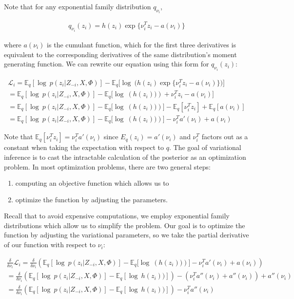 Note that for any exponential family distribution $q_{\nu_i}$, 

\begin{align} q_{\nu_i}(z_i) = h(z_i) \exp \big\{ \nu_i^{T} z_i - a(\nu_i) \big\} \end{align}

where $a(\nu_i)$ is the cumulant function, which for the first three derivatives is equivalent to the corresponding derivatives of the same distribution's moment generating function. We can rewrite our equation using this form for $q_{\nu_i}(z_i)$:


\begin{align} 
\nonumber \mathcal{L}_i = \mathbb{E}_q[\log\ p(z_i| Z_{-i}, X, \Phi)] - \mathbb{E}_q\bigg[\log\ \Big( h(z_i) \exp \big\{ \nu_i^{T} z_i - a(\nu_i) \big\} \Big) \bigg] \\
\nonumber = \mathbb{E}_q[\log\ p(z_i| Z_{-i}, X, \Phi)] -  \mathbb{E}_q\bigg[\log\ \left( h(z_i))\right) + \nu_i^{T} z_i - a(\nu_i) \bigg] \\
\nonumber = \mathbb{E}_q[\log\ p(z_i| Z_{-i}, X, \Phi)] -  \mathbb{E}_q\big[\log\ \left( h(z_i))\right)\big] - \mathbb{E}_q[\nu_i^T z_i]  + \mathbb{E}_q[a(\nu_i)] \\
= \mathbb{E}_q[\log\ p(z_i| Z_{-i}, X, \Phi)] -  \mathbb{E}_q\big[\log\ \left( h(z_i))\right)\big] - \nu_i^T a'(\nu_i) + a(\nu_i)
\end{align} 


Note that $\mathbb{E}_q[\nu_i^Tz_i] = \nu_i^T a'(\nu_i)$ since $E_q(z_i) = a'(\nu_i)$ and $\nu_i^T$ factors out as a constant when taking the expectation with respect to $q$. The goal of variational inference is to cast the intractable calculation of the posterior as an optimization problem. In most optimization problems, there are two general steps: 
\begin{enumerate}
    \item computing an objective function which allows us to 
    \item optimize the function by adjusting the parameters. 
\end{enumerate} 

Recall that to avoid expensive computations, we employ exponential family distributions which allow us to simplify the problem. Our goal is to optimize the function by adjusting the variational parameters, so we take the partial derivative of our function with respect to $\nu_i$: 

\begin{align}
\nonumber \frac{\delta}{\delta \nu_i} \mathcal{L}_i = \frac{\delta}{\delta \nu_i} \left( \mathbb{E}_q[\log\ p(z_i| Z_{-i}, X, \Phi)] -  \mathbb{E}_q\big[\log\ \left( h(z_i))\right)\big] - \nu_i^T a'(\nu_i) + a(\nu_i) \right) \\
\nonumber = \frac{\delta}{\delta \nu_i} \left( \mathbb{E}_q[\log\ p(z_i| Z_{-i}, X, \Phi)] -  \mathbb{E}_q[\log\ h(z_i))] \right) - \left(\nu_i^Ta''(\nu_i)  + a''(\nu_i)\right) + a''(\nu_i) \\
= \frac{\delta}{\delta \nu_i} \left( \mathbb{E}_q[\log\ p(z_i| Z_{-i}, X, \Phi)] -  \mathbb{E}_q[\log\ h(z_i))] \right) - \nu_i^Ta''(\nu_i)
\end{align}

